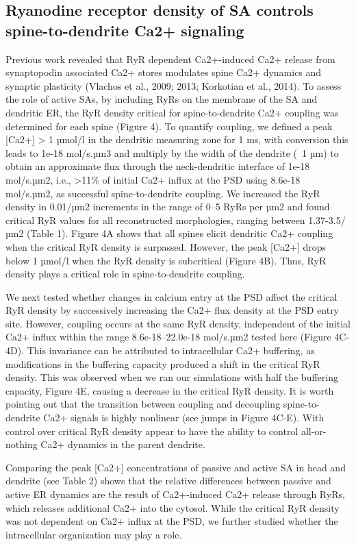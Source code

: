 \documentclass[fleqn,12pt]{wlscirep}
\begin{document}
\subsection*{Ryanodine receptor density of SA controls spine-to-dendrite Ca2+ signaling} Previous work revealed that RyR dependent Ca2+-induced Ca2+ release from synaptopodin associated Ca2+ stores modulates spine Ca2+ dynamics and synaptic plasticity (Vlachos et al., 2009; 2013; Korkotian et al., 2014). To assess the role of active SAs, by including RyRs on the membrane of the SA and dendritic ER, the RyR density critical for spine-to-dendrite Ca2+ coupling was determined for each spine (Figure 4). To quantify coupling, we defined a peak [Ca2+] > 1 µmol/l in the dendritic measuring zone for 1 ms, with conversion this leads to 1e-18 mol/s.µm3 and multiply by the width of the dendrite (~1 µm) to obtain an approximate flux through the neck-dendritic interface of 1e-18 mol/s.µm2, i.e., >11\% of initial Ca2+ influx at the PSD using 8.6e-18 mol/s.µm2,  as successful spine-to-dendrite coupling. We increased the RyR density in 0.01/µm2 increments in the range of 0–5 RyRs per µm2 and found critical RyR values for all reconstructed morphologies, ranging between 1.37-3.5/µm2 (Table 1). Figure 4A shows that all spines elicit dendritic Ca2+ coupling when the critical RyR density is surpassed. However, the peak [Ca2+] drops below 1 µmol/l when the RyR density is subcritical (Figure 4B). Thus, RyR density plays a critical role in spine-to-dendrite coupling.

We next tested whether changes in calcium entry at the PSD affect the critical RyR density by successively increasing the Ca2+ flux density at the PSD entry site. However, coupling occurs at the same RyR density, independent of the initial Ca2+ influx within the range 8.6e-18--22.0e-18 mol/s.µm2 tested here (Figure 4C-4D). This invariance can be attributed to intracellular Ca2+ buffering, as modifications in the buffering capacity produced a shift in the critical RyR density. This was observed when we ran our simulations with half the buffering capacity, Figure 4E, causing a decrease in the critical RyR density. It is worth pointing out that the transition between coupling and decoupling spine-to-dendrite Ca2+ signals is highly nonlinear (see jumps in Figure 4C-E). With control over critical RyR density appear to have the ability to control all-or-nothing Ca2+ dynamics in the parent dendrite.

Comparing the peak [Ca2+] concentrations of passive and active SA in head and dendrite (see Table 2) shows that the relative differences between passive and active ER dynamics are the result of Ca2+-induced Ca2+ release through RyRs, which releases additional Ca2+ into the cytosol. While the critical RyR density was not dependent on Ca2+ influx at the PSD, we further studied whether the intracellular organization may play a role. 
\end{document}
